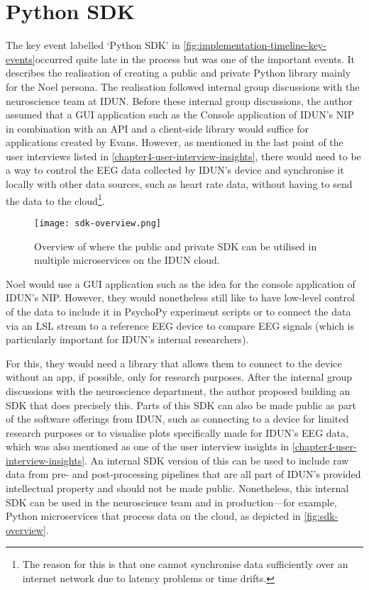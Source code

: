 \section*{Python SDK}
\label{chapter4-python-sdk}

The key event labelled ‘Python SDK’ in \autoref{fig:implementation-timeline-key-events}occurred quite late in the process but was one of the important events. It describes the realisation of creating a public and private Python library mainly for the Noel persona. The realisation followed internal group discussions with the neuroscience team at IDUN. Before these internal group discussions, the author assumed that a GUI application such as the Console application of IDUN’s NIP in combination with an API and a client-side library would suffice for applications created by Evans. However, as mentioned in the last point of the user interviews listed in \autoref{chapter4-user-interview-insights}, there would need to be a way to control the EEG data collected by IDUN’s device and synchronise it locally with other data sources, such as heart rate data, without having to send the data to the cloud\footnote{The reason for this is that one cannot synchronise data sufficiently over an internet network due to latency problems or time drifts.}.

\begin{figure}[ht]
  \centering
  \texttt{[image: sdk-overview.png]}
  \caption{Overview of where the public and private SDK can be utilised in multiple microservices on the IDUN cloud.}
  \label{fig:sdk-overview}
\end{figure}

Noel would use a GUI application such as the idea for the console application of IDUN’s NIP. However, they would nonetheless still like to have low-level control of the data to include it in PsychoPy experiment scripts or to connect the data via an LSL stream to a reference EEG device to compare EEG signals (which is particularly important for IDUN’s internal researchers).

For this, they would need a library that allows them to connect to the device without an app, if possible, only for research purposes. After the internal group discussions with the neuroscience department, the author proposed building an SDK that does precisely this. Parts of this SDK can also be made public as part of the software offerings from IDUN, such as connecting to a device for limited research purposes or to visualise plots specifically made for IDUN’s EEG data, which was also mentioned as one of the user interview insights in \autoref{chapter4-user-interview-insights}. An internal SDK version of this can be used to include raw data from pre- and post-processing pipelines that are all part of IDUN’s provided intellectual property and should not be made public. Nonetheless, this internal SDK can be used in the neuroscience team and in production—for example, Python microservices that process data on the cloud, as depicted in \autoref{fig:sdk-overview}.

